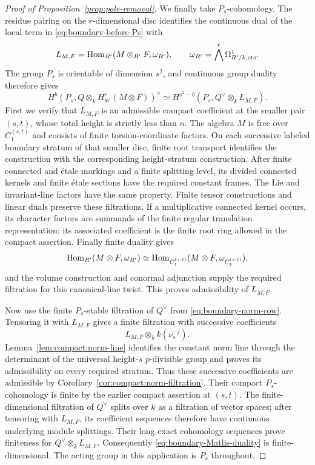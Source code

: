 \begin{proof}[Proof of Proposition~\ref{prop:pole-removal}]
We finally take $P_s$-cohomology.  The residue pairing on the
$r$-dimensional disc identifies the continuous dual of the local
term in \eqref{eq:boundary-before-Ps} with
\[
 L_{M,F}=\operatorname{Hom}_{R'}(M\otimes_{R'}F,\omega_{R'}),
 \qquad
 \omega_{R'}=\bigwedge^r\Omega^1_{R'/k,\mathrm{cts}}.
\]
The group $P_s$ is orientable of dimension $s^2$, and continuous
group duality therefore gives
\begin{equation}
 \label{eq:boundary-Matlis-duality}
 H^b\!\left(P_s,
    Q\otimes_kH^r_{\mathfrak m'}(M\otimes F)\right)^\vee
 \simeq
 H^{s^2-b}(P_s,Q^\vee\otimes_kL_{M,F}).
\end{equation}
First we verify that $L_{M,F}$ is an admissible compact
coefficient at the smaller pair $(s,t)$, whose total height is
strictly less than $n$.  The algebra $M$ is free over
$C_1^{(s,t)}$ and consists of finite torsion-coordinate factors.
On each successive labeled boundary stratum of that smaller
disc, finite root transport identifies the construction with
the corresponding height-stratum construction.  After finite
connected and \'etale markings and a finite splitting level,
its divided connected kernels and finite \'etale sections have
the required constant frames.  The Lie and invariant-line
factors have the same property.  Finite tensor constructions
and linear duals preserve these filtrations.  If a
multiplicative connected kernel occurs, its character factors
are summands of the finite regular translation representation;
its associated coefficient is the finite root ring allowed in
the compact assertion.  Finally finite duality gives
\[
 \operatorname{Hom}_{R'}(M\otimes F,\omega_{R'})
 \simeq
 \operatorname{Hom}_{C_1^{(s,t)}}(M\otimes F,\omega_{C_1^{(s,t)}}),
\]
and the volume construction and conormal adjunction supply the
required filtration for this canonical-line twist.  This proves
admissibility of $L_{M,F}$.

Now use the finite $P_s$-stable filtration of $Q^\vee$ from
\eqref{eq:boundary-norm-row}.  Tensoring it with $L_{M,F}$
gives a finite filtration with successive coefficients
\[
 L_{M,F}\otimes_k k(\nu_s^{-j}).
\]
Lemma~\ref{lem:compact:norm-line} identifies the constant norm
line through the determinant of the universal height-$s$
$p$-divisible group and proves its admissibility on every
required stratum.  Thus these successive coefficients are
admissible by Corollary~\ref{cor:compact:norm-filtration}.
Their compact $P_s$-cohomology is finite by the earlier compact
assertion at $(s,t)$.  The finite-dimensional filtration of
$Q^\vee$ splits over $k$ as a filtration of vector spaces;
after tensoring with $L_{M,F}$, its coefficient sequences
therefore have continuous underlying module splittings.
Their long exact cohomology sequences prove finiteness for
$Q^\vee\otimes_kL_{M,F}$.  Consequently
\eqref{eq:boundary-Matlis-duality} is finite-dimensional.
The acting group in this application is $P_s$ throughout.


\end{proof}
